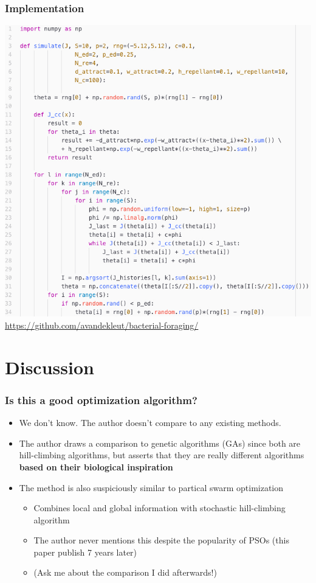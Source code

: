 \documentclass{beamer}
\begin{document}
\begin{frame}
\frametitle{Implementation}
\begin{center}
\includegraphics[scale=0.25]{assets/code}
\href{github.com/avandekleut/bacterial-foraging}{https://github.com/avandekleut/bacterial-foraging/}
\end{center}
\end{frame}

\section{Discussion}

\begin{frame}
\frametitle{Is this a good optimization algorithm?}
\begin{itemize}
  \item<2-> We don't know. The author doesn't compare to any existing methods.
  \item<3-> The author draws a comparison to genetic algorithms (GAs) since both are hill-climbing algorithms, but asserts that they are really different algorithms \textbf{based on their biological inspiration}
  \item<4-> The method is also suspiciously similar to partical swarm optimization
  \begin{itemize}
    \item<5-> Combines local and global information with stochastic hill-climbing algorithm
    \item<5-> The author never mentions this despite the popularity of PSOs (this paper publish 7 years later)
    \item<6-> (Ask me about the comparison I did afterwards!)
  \end{itemize}
\end{itemize}
\end{frame}
\end{document}
